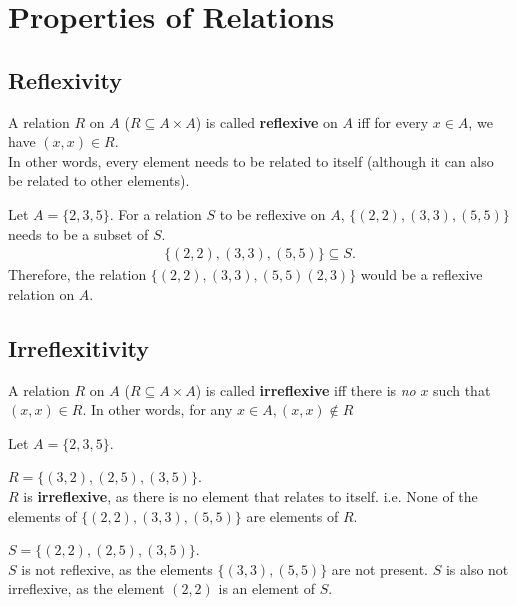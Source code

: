 \documentclass[../notes.tex]{subfiles}
\begin{document}
		\section{Properties of Relations}
			\subsection{Reflexivity}
				A relation $R$ on $A$ ($R \subseteq A \times A$) is called \textbf{reflexive} on $A$ iff for every $x \in A$, we have $(x, x) \in R$.\\
				In other words, every element needs to be related to itself (although it can also be related to other elements).
				\begin{example}
					Let $A = \{2, 3, 5\}$. For a relation $S$ to be reflexive on $A$, $\bigl\{(2, 2), (3, 3), (5, 5)\bigr\}$ needs to be a subset of $S$.
						\begin{align*}
							\bigl\{(2, 2), (3, 3), (5, 5)\bigr\} \subseteq S.
						\end{align*}
					Therefore, the relation $\bigl\{(2, 2), (3, 3), (5, 5) (2, 3)\bigr\}$ would be a reflexive relation on $A$.
				\end{example}
			\subsection{Irreflexitivity}
				A relation $R$ on $A$ ($R \subseteq A \times A$) is called \textbf{irreflexive} iff there is \textit{no} $x$ such that $(x, x) \in R$. In other words, for any $x \in A, (x, x) \notin R$
				\begin{example}
					Let $A = \{2, 3, 5\}$.\par
					$R = \bigl\{(3, 2), (2, 5), (3, 5)\bigr\}$.\\
					$R$ is \textbf{irreflexive}, as there is no element that relates to itself. i.e. None of the elements of $\bigl\{(2, 2), (3, 3), (5, 5)\bigr\}$ are elements of $R$.\par
					$S = \bigl\{(2, 2), (2, 5), (3, 5)\bigr\}$.\\
					$S$ is not reflexive, as the elements $\bigl\{(3, 3), (5, 5)\bigr\}$ are not present. $S$ is also not irreflexive, as the element $(2, 2)$ is an element of $S$.
				\end{example}
\end{document}
